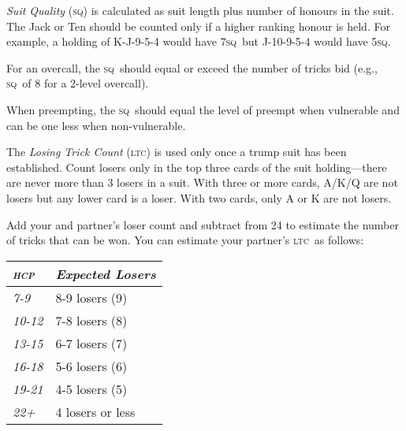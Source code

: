 \documentclass[10pt]{article}%
\newcommand{\gap}{\vspace{\baselineskip}}
\newcommand{\hcp}{\textsc{hcp}}
\newcommand{\sq}{\textsc{sq}}
\newcommand{\ltc}{\textsc{ltc}}
\begin{document}
\gap

\emph{Suit Quality} (\sq) is calculated as suit length plus number of
honours in the suit. The Jack or Ten should be counted only if a
higher ranking honour is held. For example, a holding of K-J-9-5-4
would have 7\sq\ but J-10-9-5-4 would have 5\sq.

For an overcall, the \sq\ should equal or exceed the number of tricks
bid (e.g., \sq\ of 8 for a 2-level overcall).

When preempting, the \sq\ should equal the level of preempt when
vulnerable and can be one less when non-vulnerable.

\gap

The \emph{Losing Trick Count} (\ltc) is used only once a trump suit
has been established. Count losers only in the top three cards of the
suit holding---there are never more than 3 losers in a suit. With
three or more cards, A/K/Q are not losers but any lower card is a
loser. With two cards, only A or K are not losers.

Add your and partner's loser count and subtract from 24 to estimate
the number of tricks that can be won.  You can estimate your partner's
\ltc\ as follows:

\begin{tabular}{p{2.5cm}p{8.5cm}}
  \emph{\hcp{}} & \emph{Expected Losers} \\
  \hline
  \emph{7-9} & 8-9 losers (9) \\
  \emph{10-12} & 7-8 losers (8) \\
  \emph{13-15} & 6-7 losers (7) \\
  \emph{16-18} & 5-6 losers (6) \\
  \emph{19-21} & 4-5 losers (5) \\
  \emph{22+} & 4 losers or less \\
  \hline
\end{tabular}
\end{document}
